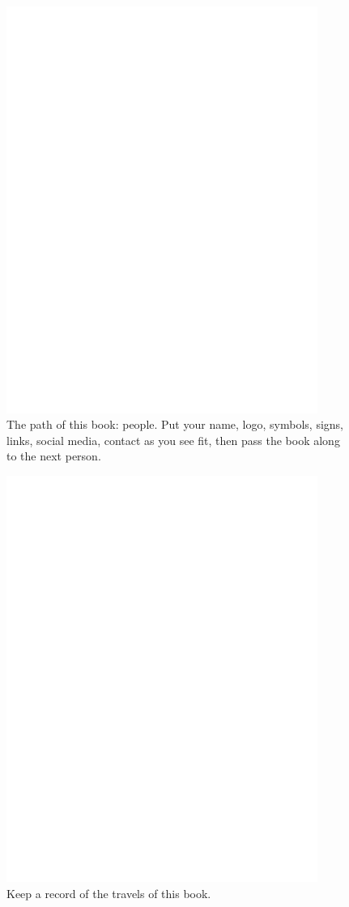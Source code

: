  \begin{figure}
	\centering
	\includegraphics[width=4in]{imageserver/uploadimages/image3.png}
	\caption[people]
	{The path of this book: people.  Put your name, logo, symbols, signs, links, social media, contact as you see fit, then pass the book along to the next person.}
\end{figure}

 \begin{figure}
	\centering
	\includegraphics[width=4in]{imageserver/uploadimages/image3.png}
	\caption[places]
	{Keep a record of the travels of this book.}
\end{figure}

